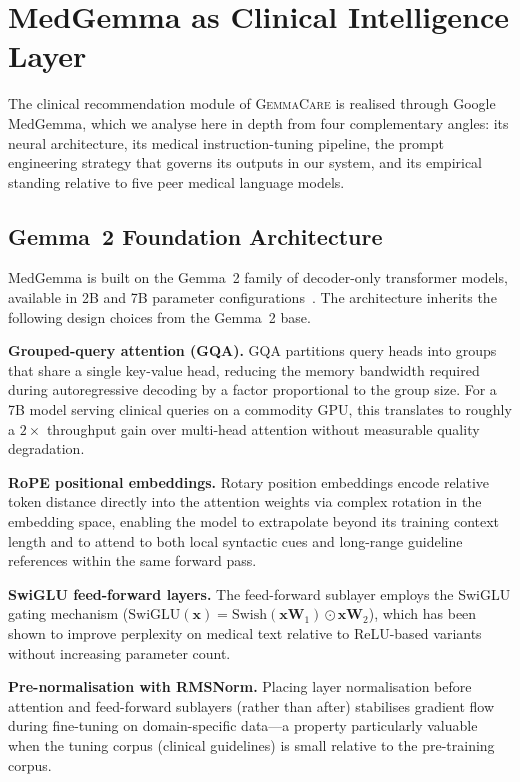 \documentclass[journal]{IEEEtran}
\newcommand{\GC}{\textsc{GemmaCare}}
\begin{document}
\section{MedGemma as Clinical Intelligence Layer}
\label{sec:medgemma}

The clinical recommendation module of \GC{} is realised through Google
MedGemma, which we analyse here in depth from four complementary angles:
its neural architecture, its medical instruction-tuning pipeline, the
prompt engineering strategy that governs its outputs in our system, and its
empirical standing relative to five peer medical language models.

\subsection{Gemma~2 Foundation Architecture}

MedGemma is built on the Gemma~2 family of decoder-only transformer models,
available in 2B and 7B parameter configurations~\cite{medgemma2024}. The
architecture inherits the following design choices from the Gemma~2 base.

\textbf{Grouped-query attention (GQA).} GQA partitions query heads into
groups that share a single key-value head, reducing the memory bandwidth
required during autoregressive decoding by a factor proportional to the
group size. For a 7B model serving clinical queries on a commodity GPU, this
translates to roughly a $2\times$ throughput gain over multi-head attention
without measurable quality degradation.

\textbf{RoPE positional embeddings.} Rotary position embeddings encode
relative token distance directly into the attention weights via complex
rotation in the embedding space, enabling the model to extrapolate beyond
its training context length and to attend to both local syntactic cues and
long-range guideline references within the same forward pass.

\textbf{SwiGLU feed-forward layers.} The feed-forward sublayer employs
the SwiGLU gating mechanism ($\text{SwiGLU}(\mathbf{x}) =
\text{Swish}(\mathbf{x}\mathbf{W}_1) \odot \mathbf{x}\mathbf{W}_2$),
which has been shown to improve perplexity on medical text relative to
ReLU-based variants without increasing parameter count.

\textbf{Pre-normalisation with RMSNorm.} Placing layer normalisation before
attention and feed-forward sublayers (rather than after) stabilises
gradient flow during fine-tuning on domain-specific data—a property
particularly valuable when the tuning corpus (clinical guidelines) is small
relative to the pre-training corpus.
\end{document}
